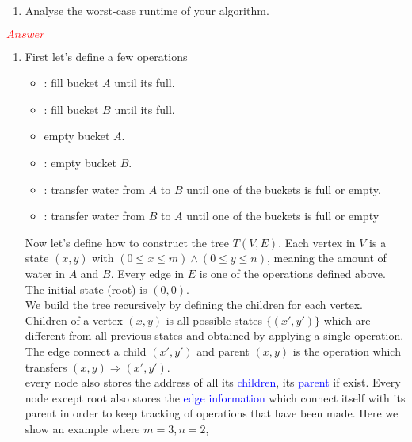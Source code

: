 \documentclass[11pt,twoside]{article}
\begin{document}
\begin{enumerate}[leftmargin=0pt]
\begin{enumerate}[topsep=\parsep]
	\item  Analyse the worst-case runtime of your algorithm.
	
	\end{enumerate}
	
	\textcolor{red} {$Answer$}
	\begin{enumerate}[topsep=\parsep]
	\item  First let's define a few operations
		\begin{itemize}[label = {}]
		\item {}: fill bucket $A$ until its full.
		\item {}: fill bucket $B$ until its full.
		\item {} empty bucket $A$.
		\item {}: empty bucket $B$.
		\item {}:  transfer water from $A$ to $B$ until one of the buckets is full or empty.
		\item {}:   transfer water from $B$ to $A$ until one of the buckets is full or empty
		\end{itemize}
		Now let's define how to construct the tree $T(V,E)$. Each vertex in $V$ is a state $(x,y)$ with 
		$(0 \leq x \leq  m)\wedge ( 0 \leq y \leq n)$, meaning the amount of water in $A$  and $B$. 
		Every edge in $E$ is one of the operations defined above. The initial state (root) is $(0,0)$.\\
		We build the tree recursively by defining the children for each vertex. Children of a vertex $(x,y)$ is all 
		possible states $\{(x', y')\}$ which are different from all previous states and obtained by applying a single operation. The edge connect a child $(x',y')$ and parent $(x,y)$ is the operation which transfers $(x, y) \Rightarrow (x',y')$.	\\
	 \textcolor{blue}{ }every node also stores the address of all its \textcolor{blue}{ children}, its \textcolor{blue}{parent} if exist. Every node except root also stores the \textcolor{blue}{edge information} which connect itself with its parent in order to keep tracking of operations that have been made. 
	 Here we show an example where $m=3, n=2$,
	 \begin{center}
\end{center}
\end{enumerate}
\end{enumerate}
\end{document}
